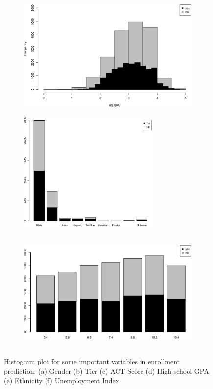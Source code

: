 \documentclass[12pt,english]{report}
\begin{document}
\begin{figure}[p]
\begin{subfigure}{0.48\textwidth}
\caption{} \label{enroll:c}
\end{subfigure}\hspace*{\fill}
\begin{subfigure}{0.48\textwidth}
\includegraphics[width=\linewidth]{pic/enroll_gpa}
\caption{} \label{enroll:d}
\end{subfigure}

\medskip
\begin{subfigure}{0.45\textwidth}
\includegraphics[width=\linewidth, height=6cm]{pic/enroll_ethnicity}
\caption{} \label{enroll:e}
\end{subfigure}\hspace*{\fill}
\begin{subfigure}{0.45\textwidth}
\includegraphics[width=\linewidth, height=6cm]{pic/enroll_index}
\caption{} \label{enroll:f}
\end{subfigure}
  \caption{Histogram plot for some important variables in enrollment
prediction: 
                        (a) Gender (b) Tier (c) ACT Score (d) High school GPA
(e) Ethnicity (f) Unemployment Index}
  \label{enroll_sum} 
\end{figure}
\end{document}
